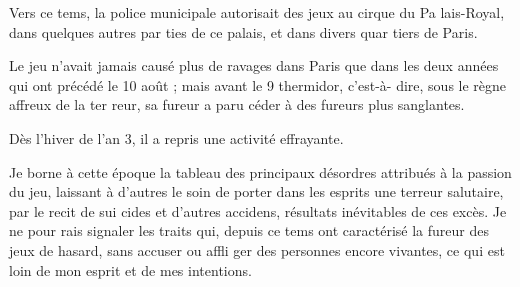 Vers ce tems, la police municipale
autorisait des jeux au cirque du Pa%
lais-Royal, dans quelques autres par%
ties de ce palais, et dans divers quar%
tiers de Paris.

Le jeu n'avait jamais causé plus de
ravages dans Paris que dans les deux
années qui ont précédé le 10 août ;
mais avant le 9 thermidor, c'est-à-%
dire, sous le règne affreux de la ter%
reur, sa fureur a paru céder à des
fureurs plus sanglantes.

Dès l'hiver de l'an 3, il a repris une
activité effrayante.

Je borne à cette époque la tableau
des principaux désordres attribués à
la passion du jeu, laissant à d'autres
le soin de porter dans les esprits une
terreur salutaire, par le recit de sui%
cides et d'autres accidens, résultats
inévitables de ces excès. Je ne pour%
rais signaler les traits qui, depuis ce
tems ont caractérisé la fureur des
jeux de hasard, sans accuser ou affli%
ger des personnes encore vivantes,
ce qui est loin de mon esprit et de
mes intentions.
